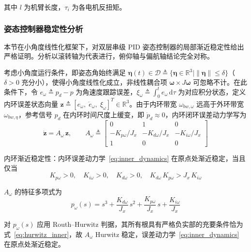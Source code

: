 其中 $l$ 为机臂长度，$\tau_i$ 为各电机反扭矩。

\subsubsection{姿态控制器稳定性分析}

本节在小角度线性化框架下，对双层串级 PID 姿态控制器的局部渐近稳定性给出严格证明。分析以滚转轴为代表进行，俯仰轴与偏航轴结论完全对称。

考虑小角度运行条件，即姿态角始终满足 $\boldsymbol{\eta}(t) \in \mathcal{D} \triangleq \{\boldsymbol{\eta} \in \mathbb{R}^3 \mid \|\boldsymbol{\eta}\| \leq \delta\}$（$\delta > 0$ 充分小），使得小角度线性化成立，非线性耦合项 $\boldsymbol{\omega} \times J\boldsymbol{\omega}$ 可忽略不计。在此条件下，令 $e_\omega \triangleq p_d - p$ 为角速度跟踪误差，$\xi_\omega \triangleq \int_0^t e_\omega\,\mathrm{d}\tau$ 为对应积分状态，定义内环误差状态向量 $\mathbf{z} \triangleq [e_\omega,\;\dot{e}_\omega,\;\xi_\omega]^T \in \mathbb{R}^3$。由于内环带宽 $\omega_{bw,\omega}$ 远高于外环带宽 $\omega_{bw,\eta}$，参考信号 $p_d$ 在内环时间尺度上缓变，即 $\dot{p}_d \approx 0$，内环闭环误差动力学写为
\begin{equation}
    \dot{\mathbf{z}} = A_\omega\,\mathbf{z}, \qquad
    A_\omega \triangleq
    \begin{bmatrix}
        0 & 1 & 0 \\
        -K_{p\omega}/J_x & -K_{d\omega}/J_x & -K_{i\omega}/J_x \\
        1 & 0 & 0
    \end{bmatrix}
    \label{eq:inner_dynamics}
\end{equation}

内环渐近稳定性：内环误差动力学~\eqref{eq:inner_dynamics} 在原点处渐近稳定，当且仅当
\begin{equation}
    K_{p\omega} > 0,\quad K_{i\omega} > 0,\quad K_{d\omega} > 0,\quad K_{d\omega}\,K_{p\omega} > J_x\,K_{i\omega}
    \label{eq:hurwitz_inner}
\end{equation}

$A_\omega$ 的特征多项式为
\begin{equation}
    p_\omega(s) = s^3 + \frac{K_{d\omega}}{J_x}\,s^2 + \frac{K_{p\omega}}{J_x}\,s + \frac{K_{i\omega}}{J_x}
\end{equation}

对 $p_\omega(s)$ 应用 Routh--Hurwitz 判据，其所有根具有严格负实部的充要条件恰为式~\eqref{eq:hurwitz_inner}，故 $A_\omega$ Hurwitz 稳定，误差动力学~\eqref{eq:inner_dynamics} 在原点处渐近稳定。

